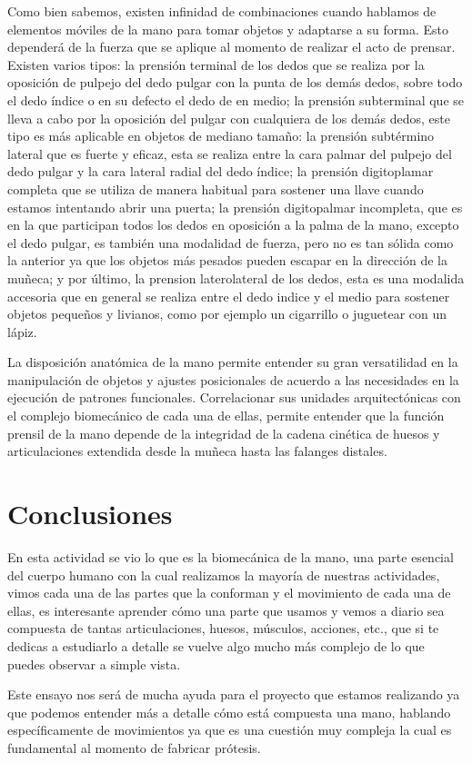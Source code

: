 \documentclass{article}
\begin{document}
Como bien sabemos, existen infinidad de combinaciones cuando hablamos de elementos móviles de la mano para tomar objetos y adaptarse a su forma. Esto dependerá de la fuerza que se aplique al momento de realizar el acto de prensar. Existen varios tipos: la prensión terminal de los dedos que se realiza por la oposición de pulpejo del dedo pulgar con la punta de los demás dedos, sobre todo el dedo índice o en su defecto el dedo de en medio; la prensión subterminal que se lleva a cabo por la oposición del pulgar con cualquiera de los demás dedos, este tipo es más aplicable en objetos de mediano tamaño: la prensión subtérmino lateral que es fuerte y eficaz, esta se realiza entre la cara palmar del pulpejo del dedo pulgar y la cara lateral radial del dedo índice; la prensión digitoplamar completa que se utiliza de manera habitual para sostener una llave cuando estamos intentando abrir una puerta; la prensión digitopalmar incompleta, que es en la que participan todos los dedos en oposición a la palma de la mano, excepto el dedo pulgar, es también una modalidad de fuerza, pero no es tan sólida como la anterior ya que los objetos más pesados pueden escapar en la dirección de la muñeca; y por último, la prension laterolateral de los dedos, esta es una modalida accesoria que en general se realiza entre el dedo indice y el medio para sostener objetos pequeños y livianos, como por ejemplo un cigarrillo o juguetear con un lápiz.

La disposición anatómica de la mano permite entender su gran versatilidad en la manipulación de objetos y ajustes posicionales de acuerdo a las necesidades en la ejecución de patrones funcionales. Correlacionar sus unidades arquitectónicas con el complejo biomecánico de cada una de ellas, permite entender que la función prensil de la mano depende de la integridad de la cadena cinética de huesos y articulaciones extendida desde la muñeca hasta las falanges distales. 

\cite{voegeli2000lecciones}
\newpage

\section{Conclusiones}
En esta actividad se vio lo que es la biomecánica de la mano, una parte esencial del cuerpo humano con la cual realizamos la mayoría de nuestras actividades, vimos cada una de las partes que la conforman y el movimiento de cada una de ellas, es interesante aprender cómo una parte que usamos y vemos a diario sea compuesta de tantas articulaciones, huesos, músculos, acciones, etc., que si te dedicas a estudiarlo a detalle se vuelve algo mucho más complejo de lo que puedes observar a simple vista.

Este ensayo nos será de mucha ayuda para el proyecto que estamos realizando ya que podemos entender más a detalle cómo está compuesta una mano, hablando específicamente de movimientos ya que es una cuestión muy compleja la cual es fundamental al momento de fabricar prótesis.





\end{document}

